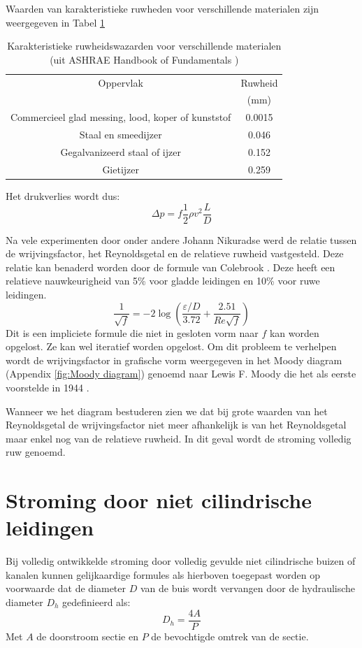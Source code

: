 Waarden van karakteristieke ruwheden voor verschillende materialen zijn weergegeven in Tabel \ref{tab:ruwheid van materialen}
\begin{table}[htb]
	\centering
	\begin{tabular}{cc}
		\hline
		Oppervlak & Ruwheid \\
		   & (mm) \\
		\hline
		Commercieel glad messing, lood, koper of kunststof & 0.0015 \\
		Staal en smeedijzer & 0.046 \\
		Gegalvanizeerd staal of ijzer & 0.152 \\
		Gietijzer & 0.259 \\
		\hline
	\end{tabular}
	\caption{Karakteristieke ruwheidswazarden voor verschillende materialen (uit ASHRAE Handbook of Fundamentals \cite{ASHRAE_Fundamentals})}
	\label{tab:ruwheid van materialen}
\end{table}
Het drukverlies wordt dus:
\begin{equation}
	\Delta p = f \frac{1}{2}\rho v^2 \frac{L}{D}
	\label{eqn:drukval bij turbulente stroming}
\end{equation}

Na vele experimenten door onder andere Johann Nikuradse \cite{Nikuradse1926} werd de relatie tussen de wrijvingsfactor, het Reynoldsgetal en de relatieve ruwheid vastgesteld. Deze relatie kan benaderd worden door de formule van Colebrook \cite{Colebrook1937}. Deze heeft een relatieve nauwkeurigheid van 5\% voor gladde leidingen en 10\% voor ruwe leidingen.
\begin{equation}
	\frac{1}{\sqrt{f}} = -2 \log \left( \frac{\varepsilon/D}{3.72} + \frac{2.51}{Re \sqrt{f}} \right)
	\label{eqn:colebrook}
\end{equation}
Dit is een impliciete formule die niet in gesloten vorm naar $f$ kan worden opgelost. Ze kan wel iteratief worden opgelost.  Om dit probleem te verhelpen wordt de wrijvingsfactor in grafische vorm weergegeven in het Moody diagram (Appendix \ref{fig:Moody diagram}) genoemd naar Lewis F. Moody die het als eerste voorstelde in 1944 \cite{Moody1944}.

Wanneer we het diagram bestuderen zien we dat bij grote waarden van het Reynoldsgetal de wrijvingsfactor niet meer afhankelijk is van het Reynoldsgetal maar enkel nog van de relatieve ruwheid. In dit geval wordt de stroming volledig ruw genoemd.

		\section{Stroming door niet cilindrische leidingen}
Bij volledig ontwikkelde stroming door volledig gevulde niet cilindrische buizen of kanalen kunnen gelijkaardige formules als hierboven toegepast worden op voorwaarde dat de diameter $D$ van de buis wordt vervangen door de hydraulische diameter $D_h$ gedefinieerd als:
\begin{equation}
	D_h = \frac{4 A}{P}
\end{equation}
Met $A$ de doorstroom sectie en $P$ de bevochtigde omtrek van de sectie.
	


